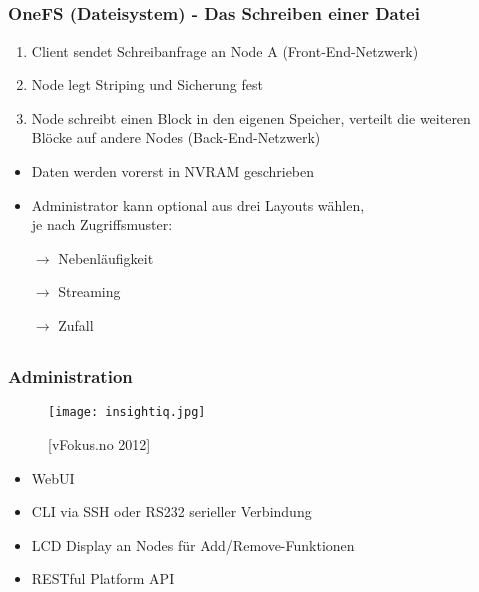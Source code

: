 \documentclass{beamer}
\begin{document}
\subsection{}
\begin{frame}[fragile]
  \frametitle{OneFS (Dateisystem) - Das Schreiben einer Datei}
  
  \begin{enumerate}
    \item Client sendet Schreibanfrage an Node A (Front-End-Netzwerk)
    \item Node legt Striping und Sicherung fest
    \item Node schreibt einen Block in den eigenen Speicher,
    verteilt die weiteren Blöcke auf andere Nodes (Back-End-Netzwerk)
    \end{enumerate}
  
  \begin{itemize}
    \item Daten werden vorerst in NVRAM geschrieben 
    \item Administrator kann optional aus drei Layouts wählen, \\
    je nach Zugriffsmuster:
    \vspace{2mm}
    \item[$\rightarrow$] Nebenläufigkeit 
    \item[$\rightarrow$] Streaming
    \item[$\rightarrow$] Zufall
        
  \end{itemize}
  
  

\end{frame}

      

\subsection{}
\begin{frame}[fragile]
  \frametitle{Administration}
  
  \begin{figure}[htp]
    \centering
    \texttt{[image: insightiq.jpg]}
    \caption{[vFokus.no 2012]}
  \end{figure}
  
  \vspace{-5mm}

  \begin{itemize}
    \item WebUI
    \item CLI via SSH oder RS232 serieller Verbindung
    \item LCD Display an Nodes für Add/Remove-Funktionen
    \item RESTful Platform API
  \end{itemize}

\end{frame}  
\end{document}
